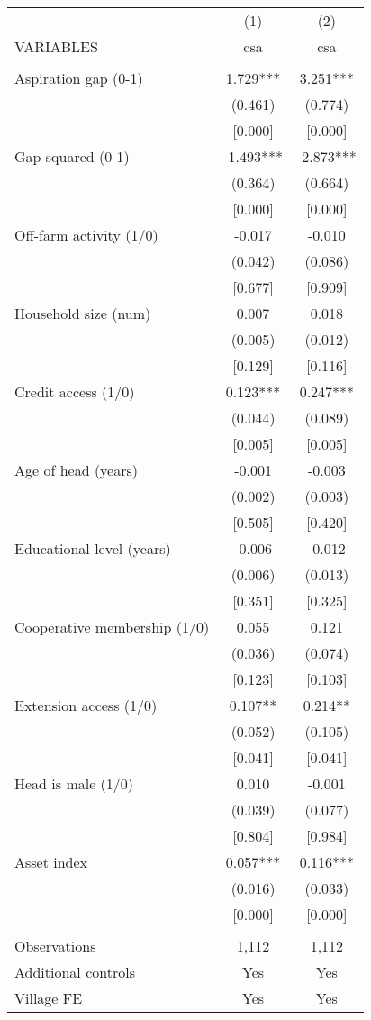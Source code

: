 \documentclass[]{article}
\begin{document}
\begin{tabular}{lcc} \hline
 & (1) & (2) \\
VARIABLES & csa & csa \\ \hline
 &  &  \\
Aspiration gap (0-1) & 1.729*** & 3.251*** \\
 & (0.461) & (0.774) \\
 & [0.000] & [0.000] \\
Gap squared (0-1) & -1.493*** & -2.873*** \\
 & (0.364) & (0.664) \\
 & [0.000] & [0.000] \\
Off-farm activity (1/0) & -0.017 & -0.010 \\
 & (0.042) & (0.086) \\
 & [0.677] & [0.909] \\
Household size (num) & 0.007 & 0.018 \\
 & (0.005) & (0.012) \\
 & [0.129] & [0.116] \\
Credit access (1/0) & 0.123*** & 0.247*** \\
 & (0.044) & (0.089) \\
 & [0.005] & [0.005] \\
Age of head (years) & -0.001 & -0.003 \\
 & (0.002) & (0.003) \\
 & [0.505] & [0.420] \\
Educational level (years) & -0.006 & -0.012 \\
 & (0.006) & (0.013) \\
 & [0.351] & [0.325] \\
Cooperative membership (1/0) & 0.055 & 0.121 \\
 & (0.036) & (0.074) \\
 & [0.123] & [0.103] \\
Extension access (1/0) & 0.107** & 0.214** \\
 & (0.052) & (0.105) \\
 & [0.041] & [0.041] \\
Head is male (1/0) & 0.010 & -0.001 \\
 & (0.039) & (0.077) \\
 & [0.804] & [0.984] \\
Asset index & 0.057*** & 0.116*** \\
 & (0.016) & (0.033) \\
 & [0.000] & [0.000] \\
 &  &  \\
Observations & 1,112 & 1,112 \\
Additional controls & Yes & Yes \\
 Village FE & Yes & Yes \\ \hline
\end{tabular}
\end{document}
